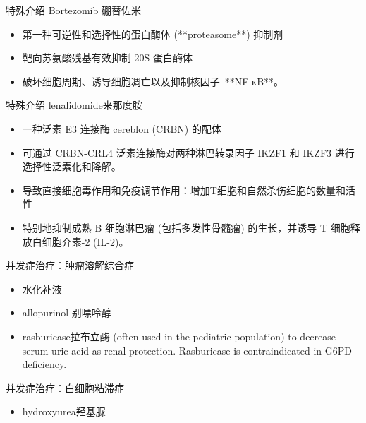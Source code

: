 \documentclass[
  ignorenonframetext,
]{beamer}
\providecommand{\tightlist}{%
  \setlength{\itemsep}{0pt}\setlength{\parskip}{0pt}}
\begin{document}
\begin{frame}
\begin{block}{特殊介绍 Bortezomib 硼替佐米}
\protect\hypertarget{ux7279ux6b8aux4ecbux7ecd-bortezomib-ux787cux66ffux4f50ux7c73}{}
\begin{itemize}
\item
  第一种可逆性和选择性的蛋白酶体 (**proteasome**) 抑制剂
\item
  靶向苏氨酸残基有效抑制 20S 蛋白酶体
\item
  破坏细胞周期、诱导细胞凋亡以及抑制核因子~**NF-κB**。
\end{itemize}
\end{block}
\end{frame}

\begin{frame}
\begin{block}{特殊介绍 lenalidomide来那度胺}
\protect\hypertarget{ux7279ux6b8aux4ecbux7ecd-lenalidomideux6765ux90a3ux5ea6ux80fa}{}
\begin{itemize}
\item
  一种泛素 E3 连接酶 cereblon (CRBN) 的配体
\item
  可通过 CRBN-CRL4 泛素连接酶对两种淋巴转录因子 IKZF1 和 IKZF3
  进行选择性泛素化和降解。
\item
  导致直接细胞毒作用和免疫调节作用：增加T细胞和自然杀伤细胞的数量和活性
\item
  特别地抑制成熟 B 细胞淋巴瘤 (包括多发性骨髓瘤) 的生长，并诱导 T
  细胞释放白细胞介素-2 (IL-2)。
\end{itemize}
\end{block}
\end{frame}

\begin{frame}
\begin{block}{并发症治疗：肿瘤溶解综合症}
\protect\hypertarget{ux5e76ux53d1ux75c7ux6cbbux7597ux80bfux7624ux6eb6ux89e3ux7efcux5408ux75c7}{}
\begin{itemize}
\item
  水化补液
\item
  allopurinol 别嘌呤醇
\item
  rasburicase拉布立酶 (often used in the pediatric population) to
  decrease serum uric acid as renal protection. Rasburicase is
  contraindicated in G6PD deficiency.
\end{itemize}
\end{block}
\end{frame}

\begin{frame}
\begin{block}{并发症治疗：白细胞粘滞症}
\protect\hypertarget{ux5e76ux53d1ux75c7ux6cbbux7597ux767dux7ec6ux80deux7c98ux6edeux75c7}{}
\begin{itemize}
\tightlist
\item
  hydroxyurea羟基脲
\end{itemize}
\end{block}
\end{frame}
\end{document}
